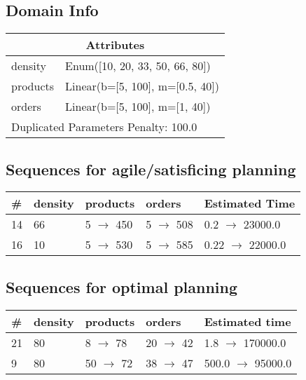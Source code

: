 \documentclass{article}
\begin{document}
                    \subsection*{Domain Info}

                    \begin{center}
                    \begin{tabular}{@{}p{}p{}@{}}
                    \multicolumn{2}{c}{\bf \large Attributes}\\\midrule
                    density & Enum([10, 20, 33, 50, 66, 80])\\
products & Linear(b=[5, 100], m=[0.5, 40])\\
orders & Linear(b=[5, 100], m=[1, 40])
                    
                     \\\midrule
                    \multicolumn{2}{l}{Duplicated Parameters Penalty: 100.0}
                    \end{tabular}
                    \end{center}
                
                         \subsection*{Sequences for agile/satisficing planning}

                        \begin{center}
                        \begin{tabular}{@{}l|l|l|l|l@{}}
                        \# & density & products & orders & Estimated Time\\\midrule
                        14&66&5 $\rightarrow$ 450&5 $\rightarrow$ 508&0.2 $\rightarrow$ 23000.0\\
16&10&5 $\rightarrow$ 530&5 $\rightarrow$ 585&0.22 $\rightarrow$ 22000.0
                        \end{tabular}
                        \end{center}
                    
                            \subsection*{Sequences for optimal planning}

                            \begin{center}
                            \begin{tabular}{@{}l|l|l|l|l@{}}
                            \# & density & products & orders & Estimated time\\\midrule
                            21&80&8 $\rightarrow$ 78&20 $\rightarrow$ 42&1.8 $\rightarrow$ 170000.0\\
9&80&50 $\rightarrow$ 72&38 $\rightarrow$ 47&500.0 $\rightarrow$ 95000.0
                            \end{tabular}
                            \end{center}
                    
\end{document}
